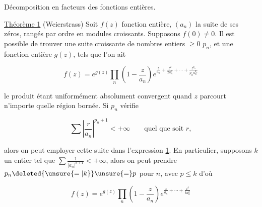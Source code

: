 
Décomposition en facteurs des fonctions entières.

\uline{Théorème 1} (Weierstrass) Soit $f(z)$ fonction entière, $(a_n)$ la suite de ses zéros, rangés par ordre en modules croissants. Supposons $f(0)\ne0$. Il est possible de trouver une suite croissante de nombres entiers $\geq0$ $p_n$, et une fonction entière $g(z)$, tels que l'on ait

\[
 f(z)=e^{g(z)}\prod_n\left(1-\frac{z}{a_n}\right)e^{\frac{z}{a_n}+\frac{z^2}{2a_n^2}+\cdots+\frac{z^{p_n}}{p_n a_n^{p_n}}} \tag*{(1)}
\]

le produit étant uniformément absolument convergent quand $z$ parcourt n'importe quelle région bornée. Si   $p_n$ vérifie

\[
 \sum\left|\frac{r}{a_n}\right|^{p_n+1}<+\infty\qquad\text{quel que soit }r,
\]

alors on peut employer cette suite dans l'expression \uline{1}. En particulier, supposons $k$ un entier tel que $\sum\frac{1}{|a_n|^{k+1}}<+\infty$, alors on peut prendre $p_n\deleted{\unsure{=|k}}\unsure{=}p$ pour  $n$, avec $p\leq k$ d'où

\[
 f(z)=e^{g(z)}\prod_n\left(1-\frac{z}{a_n}\right)e^{\frac{z}{a_n}+\cdots+\frac{z^k}{ka_n^k}} \tag*{(2)}
\]

